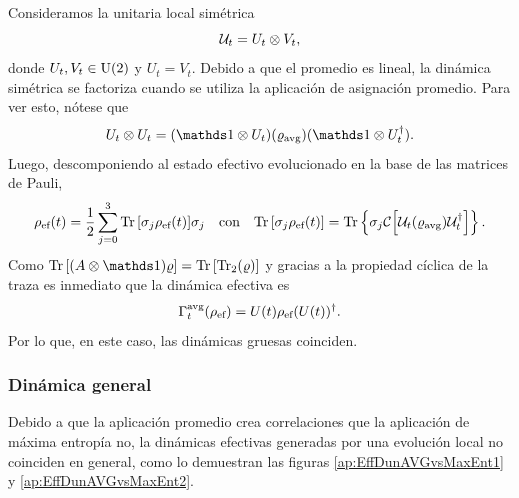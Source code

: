 Consideramos la unitaria local simétrica
\begin{equation}
    \mathcal{U}_{t}=U_{t}\otimes V_{t},\nonumber
\end{equation}
donde $U_{t},V_{t}\in\text{U}(2)$ y $U_{t}=V_{t}$. Debido a que el promedio es lineal, la dinámica simétrica se factoriza cuando se utiliza la aplicación de asignación promedio. Para ver esto, nótese que
\begin{equation}
  U_{t}\otimes U_{t}=(\Id\otimes U_{t})(\varrho_{\avg})(\Id\otimes U_{t}^{\dag}).\nonumber
\end{equation}
Luego, descomponiendo al estado efectivo evolucionado en la base de las matrices de Pauli,
\begin{align}
  \rho_{\text{ef}}(t)=\frac{1}{2}\sum_{j=0}^{3}\Tr\qty[\sigma_{j}\rho_{\text{ef}}(t)]\sigma_{j} & & \text{con} & &\Tr\qty[\sigma_{j}\rho_{\text{ef}}(t)]=\Tr\left\{\sigma_{j}\mathcal{C}\qty[\mathcal{U}_{t} (\varrho_{\text{avg}}) \mathcal{U}_{t}^{\dagger}]\right\}.\nonumber
\end{align}
Como $\Tr\qty[(A\otimes \Id) \varrho]=\Tr\qty[ \Tr_{2}(\varrho)]$ y gracias a la propiedad cíclica de la traza es inmediato que la dinámica efectiva es
\begin{equation}
    \Gamma_{t}^{\text{avg}}(\rho_{\text{ef}})=U(t)\rho_{\text{ef}}(U(t))^{\dag}.\nonumber
\end{equation}
Por lo que, en este caso, las dinámicas gruesas coinciden.

\subsubsection{Dinámica general}

Debido a que la aplicación promedio crea correlaciones que la aplicación de máxima entropía no, la dinámicas efectivas generadas por una evolución local no coinciden en general, como lo demuestran las figuras \ref{ap:EffDunAVGvsMaxEnt1} y \ref{ap:EffDunAVGvsMaxEnt2}.

